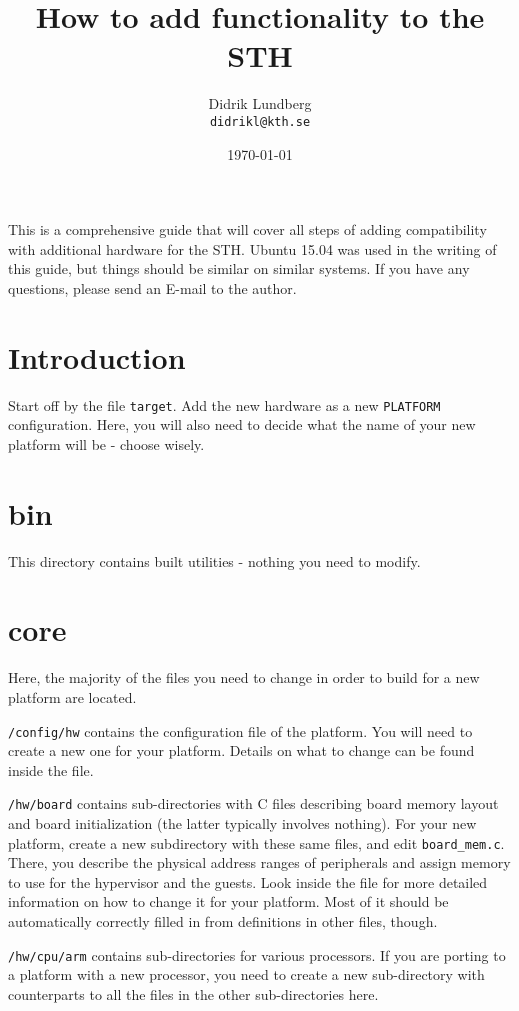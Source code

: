 \documentclass[a4paper,11pt,reqno]{amsart}
\title{How to add functionality to the STH}
\author{Didrik Lundberg\\
\texttt{didrikl@kth.se}}
\date{\today}
\begin{document}
\maketitle
\noindent
This is a comprehensive guide that will cover all steps of adding compatibility with additional hardware for the STH. Ubuntu 15.04 was used in the writing of this guide, but things should be similar on similar systems. If you have any questions, please send an E-mail to the author.
\section{Introduction}

Start off by the file \texttt{target}. Add the new hardware as a new \texttt{PLATFORM} configuration. Here, you will also need to decide what the name of your new platform will be - choose wisely.

\section{bin}

This directory contains built utilities - nothing you need to modify.

\section{core}
Here, the majority of the files you need to change in order to build for a new platform are located.

\texttt{/config/hw} contains the configuration file of the platform. You will need to create a new one for your platform. Details on what to change can be found inside the file.

\texttt{/hw/board} contains sub-directories with C files describing board memory layout and board initialization (the latter typically involves nothing). For your new platform, create a new subdirectory with these same files, and edit \texttt{board_mem.c}. There, you describe the physical address ranges of peripherals and assign memory to use for the hypervisor and the guests. Look inside the file for more detailed information on how to change it for your platform. Most of it should be automatically correctly filled in from definitions in other files, though.

\texttt{/hw/cpu/arm} contains sub-directories for various processors. If you are porting to a platform with a new processor, you need to create a new sub-directory with counterparts to all the files in the other sub-directories here.
\end{document}
